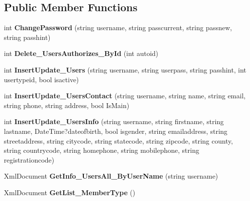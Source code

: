 \subsection*{Public Member Functions}
\begin{DoxyCompactItemize}
\item 
\hypertarget{class_data_service_a7670bef6be1600f66508d40b3efd2bed}{int {\bfseries Change\-Password} (string username, string passcurrent, string passnew, string passhint)}\label{class_data_service_a7670bef6be1600f66508d40b3efd2bed}

\item 
\hypertarget{class_data_service_a3a360a4987f916caf10b8da9a1d8f5b9}{int {\bfseries Delete\-\_\-\-Users\-Authorizes\-\_\-\-By\-Id} (int autoid)}\label{class_data_service_a3a360a4987f916caf10b8da9a1d8f5b9}

\item 
\hypertarget{class_data_service_af96d8f5aedcadd44e986bf2f3ff681f8}{int {\bfseries Insert\-Update\-\_\-\-Users} (string username, string userpass, string passhint, int usertypeid, bool isactive)}\label{class_data_service_af96d8f5aedcadd44e986bf2f3ff681f8}

\item 
\hypertarget{class_data_service_a7dff281418d38dd8e5acb13cd7593760}{int {\bfseries Insert\-Update\-\_\-\-Users\-Contact} (string username, string name, string email, string phone, string address, bool Is\-Main)}\label{class_data_service_a7dff281418d38dd8e5acb13cd7593760}

\item 
\hypertarget{class_data_service_a0a8c24a054193909af896bef4419de09}{int {\bfseries Insert\-Update\-\_\-\-Users\-Info} (string username, string firstname, string lastname, Date\-Time?dateofbirth, bool isgender, string emailaddress, string streetaddress, string citycode, string statecode, string zipcode, string county, string countrycode, string homephone, string mobilephone, string registrationcode)}\label{class_data_service_a0a8c24a054193909af896bef4419de09}

\item 
\hypertarget{class_data_service_a19746e61936a736cd426474f09c72355}{Xml\-Document {\bfseries Get\-Info\-\_\-\-Users\-All\-\_\-\-By\-User\-Name} (string username)}\label{class_data_service_a19746e61936a736cd426474f09c72355}

\item 
\hypertarget{class_data_service_ab0e59180d8f70f4be40d36bf2b6e03ac}{Xml\-Document {\bfseries Get\-List\-\_\-\-Member\-Type} ()}\label{class_data_service_ab0e59180d8f70f4be40d36bf2b6e03ac}


\end{DoxyCompactItemize}
